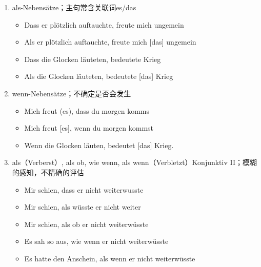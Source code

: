 \documentclass[UTF8]{report}
\begin{document}
\begin{enumerate}
    \item als-Nebensätze；主句常含关联词es/das 
    \begin{itemize}
        \item Dass er plötzlich auftauchte, freute mich ungemein
        \item Als er plötzlich auftauchte, freute mich [das] ungemein
        \item Dass die Glocken läuteten, bedeutete Krieg
        \item Als die Glocken läuteten, bedeutete [das] Krieg
    \end{itemize}
    \item wenn-Nebensätze；不确定是否会发生
    \begin{itemize}
        \item Mich freut (es), dass du morgen komms
        \item Mich freut [es], wenn du morgen kommst
        \item Wenn die Glocken läuten, bedeutet [das] Krieg.
    \end{itemize}
    \item als（Verberst）, als ob, wie wenn, als wenn（Verbletzt）Konjunktiv II；模糊的感知，不精确的评估
    \begin{itemize}
        \item Mir schien, dass er nicht weiterwusste
        \item Mir schien, als wüsste er nicht weiter
        \item Mir schien, als ob er nicht weiterwüsste
        \item Es sah so aus, wie wenn er nicht weiterwüsste
        \item Es hatte den Anschein, als wenn er nicht weiterwüsste
    \end{itemize}
\end{enumerate}
\end{document}
